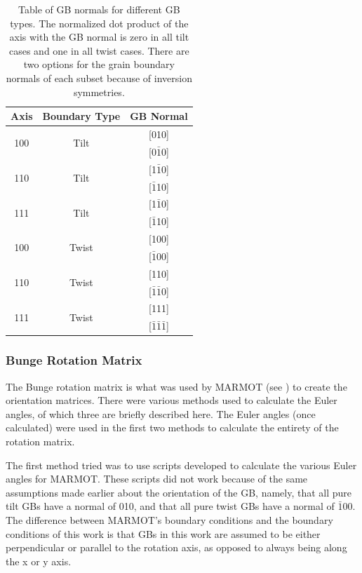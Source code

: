 \documentclass[12pt]{report}
\begin{document}
\begin{table}[ht!]
\centering
\caption{\label{table:geometricgbnorms}Table of GB normals for different GB types. The normalized dot product of the axis with the GB normal is zero in all tilt cases and one in all twist cases.  There are two options for the grain boundary normals of each subset because of inversion symmetries.}

\begin{tabular}{ccc}
\hline
Axis & Boundary Type & GB Normal \\
\hline
\multirow{2}{*}{\textlangle{}100\textrangle{}} & \multirow{2}{*}{Tilt} & [010] \\
                              & & [0$\bar{1}$0] \\
\multirow{2}{*}{\textlangle{}110\textrangle{}} & \multirow{2}{*}{Tilt} & [1$\bar{1}$0] \\
							  & & [$\bar{1}$10] \\
\multirow{2}{*}{\textlangle{}111\textrangle{}} & \multirow{2}{*}{Tilt} & [1$\bar{1}$0] \\
							  & & [$\bar{1}$10] \\
\multirow{2}{*}{\textlangle{}100\textrangle{}} & \multirow{2}{*}{Twist} & [100] \\
							  & & [$\bar{1}$00] \\
\multirow{2}{*}{\textlangle{}110\textrangle{}} & \multirow{2}{*}{Twist} & [110] \\
							  & & [$\bar{1}\bar{1}$0] \\
\multirow{2}{*}{\textlangle{}111\textrangle{}} & \multirow{2}{*}{Twist} & [111] \\
							  & & [$\bar{1}\bar{1}\bar{1}$] \\
\end{tabular}
\end{table}

\subsubsection{Bunge Rotation Matrix}
The Bunge rotation matrix is what was used by MARMOT (see ) to create the orientation matrices.  There were various methods used to calculate the Euler angles, of which three are briefly described here. The Euler angles (once calculated) were used in the first two methods to calculate the entirety of the rotation matrix.

The first method tried was to use scripts developed to calculate the various Euler angles for MARMOT.  These scripts did not work because of the same assumptions made earlier about the orientation of the GB, namely, that all pure tilt GBs have a normal of 010, and that all pure twist GBs have a normal of $\bar{1}$00.  The difference between MARMOT's boundary conditions and the boundary conditions of this work is that GBs in this work are assumed to be either perpendicular or parallel to the rotation axis, as opposed to always being along the x or y axis.
\end{document}
